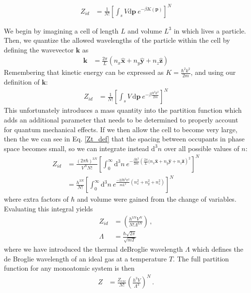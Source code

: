 \documentclass[12pt]{article}
\newcommand*{\diff}{\mathrm{d}}
\begin{document}
\begin{align}
    Z_{id} &= \frac{1}{N!}\left[\int_s V \diff\mathbf{p} ~e^{-\beta K(\mathbf{p})}\right]^{N}
\end{align}

We begin by imagining a cell of length $L$ and volume $L^3$ in which lives a particle. Then, we quantize the allowed wavelengths of the particle within the cell by defining the wavevector $\mathbf{k}$ as
\begin{align}
    \mathbf{k} &= \frac{2\pi}{L}(n_x\mathbf{\hat{x}} + n_y\mathbf{\hat{y}} + n_z\mathbf{\hat{z}})
\end{align}
Remembering that kinetic energy can be expressed as $K = \frac{\hbar^2 k^2}{2m}$, and using our definition of $\mathbf{k}$:
\begin{align}
    Z_{id} &= \frac{1}{N!}\left[\int_s V\, \diff\mathbf{p} ~e^{-\beta \frac{\hbar^2 k^2}{2m}}\right]^{N}
    \label{Zt_def}
\end{align}
This unfortunately introduces a mass quantity into the partition function which adds an additional parameter that needs to be determined to properly account for quantum mechanical effects. If we then allow the cell to become very large, then the we can see in Eq. \ref{Zt_def} that the spacing between occupants in phase space becomes small, so we can integrate instead $\diff ^3 n$ over all possible values of $n$:
\begin{align}
    Z_{id} &= \frac{(2\pi \hbar)^{3N}}{V^N N!}\left[\int_0^\infty \diff^3 n ~e^{-\frac{\beta \hbar^2}{2m} \left(\frac{2\pi}{L}(n_x\mathbf{\hat{x}} + n_y\mathbf{\hat{y}} + n_z\mathbf{\hat{z}}\right)^2}\right]^{N} \\
    &= \frac{h^{3N}}{N!}\left[\int_0^\infty \diff^3 n ~e^{ \frac{-2\beta \hbar^2\pi^2}{mL^2}(n_x^2 + n_y^2 + n_z^2)}\right]^{N}
\end{align}
where extra factors of $\hbar $ and volume were gained from the change of variables. Evaluating this integral yields
\begin{align}
    Z_{id} &= \left(\frac{h^{3N} V^N}{N!\Lambda^{3N}}\right) \,, \\
    \Lambda &= \frac{\hbar\sqrt{2\pi}}{\sqrt{mT}}
\end{align}
where we have introduced the thermal deBroglie wavelength $\Lambda$ which defines the de Broglie wavelength of an ideal gas at a temperature $T$. The full partition function for any monoatomic system is then
\begin{align}
    Z &= \frac{Z_{exc}}{N!}\left(\frac{h^3 V}{\Lambda^{3}}\right)^{N} \,.
\end{align}
\end{document}
